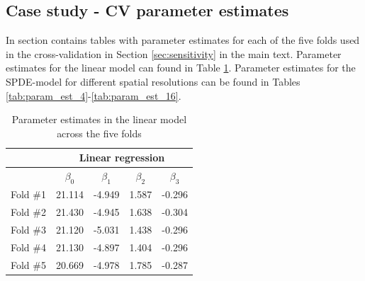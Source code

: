 \documentclass[12pt]{article} %
\begin{document}
\subsection{Case study - CV parameter estimates} \label{suppl:case-study-parameter-estimate-tables}

In section contains tables with parameter estimates for each of the five folds used in the cross-validation in Section \ref{sec:sensitivity} in the main text. Parameter estimates for the linear model can found in Table \ref{tab:param_est_lin}. Parameter estimates for the SPDE-model for different spatial resolutions can be found in Tables \ref{tab:param_est_4}-\ref{tab:param_est_16}.

\begin{table}[H]\footnotesize\centering
    \caption{Parameter estimates in the linear model across the five folds}
    \label{tab:param_est_lin}
    \begin{tabular}{c|c|c|c|c}
    & \multicolumn{4}{c}{Linear regression} \\ \hline
    & $\beta_0$ & $\beta_1$ & $\beta_2$ & $\beta_3$ \\ \hline
    
Fold \#1 & 21.114 & -4.949 & 1.587 & -0.296\\ \hline
Fold \#2 & 21.430 & -4.945 & 1.638 & -0.304\\ \hline
Fold \#3 & 21.120 & -5.031 & 1.438 & -0.296\\ \hline
Fold \#4 & 21.130 & -4.897 & 1.404 & -0.296\\ \hline
Fold \#5 & 20.669 & -4.978 & 1.785 & -0.287\\ \hline
\end{tabular}
          \end{table}
         
\end{document}
